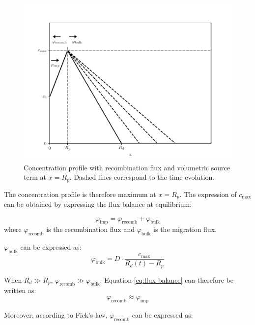 \begin{figure}[h!]
    \centering
    \includegraphics[width=0.75\linewidth]{Figures/Chapter2/recomb_sketch.pdf}
    \caption{Concentration profile with recombination flux and volumetric source term at $x=R_p$. Dashed lines correspond to the time evolution.}
    \label{fig:recomb sketch}
\end{figure}

The concentration profile is therefore maximum at $x=R_p$.
The expression of $c_\mathrm{max}$ can be obtained by expressing the flux balance at equilibrium:

\begin{equation}
    \varphi_\mathrm{imp} = \varphi_\mathrm{recomb} + \varphi_\mathrm{bulk}
    \label{eq:flux balance}
\end{equation}
where $\varphi_\mathrm{recomb}$ is the recombination flux and $\varphi_\mathrm{bulk}$ is the migration flux.

$\varphi_\mathrm{bulk}$ can be expressed as:
\begin{equation}
    \varphi_\mathrm{bulk} = D \cdot \frac{c_\mathrm{max}}{R_d(t) - R_p}
\end{equation}

When $R_d \gg R_p$, $\varphi_\mathrm{recomb} \gg \varphi_\mathrm{bulk}$.
Equation \ref{eq:flux balance} can therefore be written as:
\begin{equation}
    \varphi_\mathrm{recomb} \approx \varphi_\mathrm{imp}
    \label{eq:flux balance 2}
\end{equation}

Moreover, according to Fick's law, $\varphi_\mathrm{recomb}$ can be expressed as:

